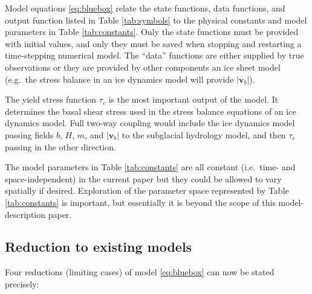 \documentclass[gmd]{copernicus}   %
\newcommand\bv{\mathbf{v}}
\begin{document}
Model equations \eqref{eq:bluebox} relate the state functions, data functions, and output function listed in Table \ref{tab:symbols} to the physical constants and model parameters in Table \ref{tab:constants}.  Only the state functions must be provided with initial values, and only they must be saved when stopping and restarting a time-stepping numerical model.  The ``data'' functions are either supplied by true observations or they are provided by other components an ice sheet model (e.g.~the stress balance in an ice dynamics model will provide $|\bv_b|$).

The yield stress function $\tau_c$ is the most important output of the model.  It determines the basal shear stress used in the stress balance equations of an ice dynamics model.  Full two-way coupling would include the ice dynamics model passing fields $b$, $H$, $m$, and $|\bv_b|$ to the subglacial hydrology model, and then $\tau_c$ passing in the other direction.

The model parameters in Table \ref{tab:constants} are all constant (i.e.~time- and space-independent) in the current paper but they could be allowed to vary spatially if desired.  Exploration of the parameter space represented by Table \ref{tab:constants} is important, but essentially it is beyond the scope of this model-description paper.

\subsection{Reduction to existing models}  Four reductions (limiting cases) of model \eqref{eq:bluebox} can now be stated precisely:
\end{document}
